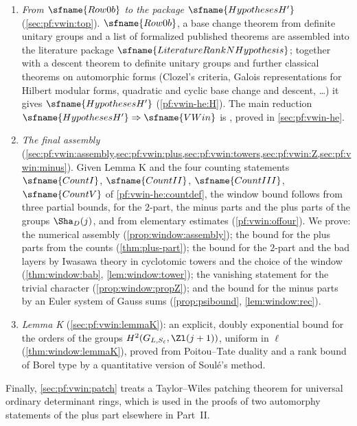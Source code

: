 \begin{enumerate}[label=(\arabic*)]
\item \emph{From $\sfname{Row0b}$ to the package $\sfname{HypothesesH'}$} (\cref{sec:pf:vwin:top}). $\sfname{Row0b}$,
a base change theorem from definite unitary groups and a list of formalized published theorems are assembled into
the literature package $\sfname{LiteratureRankNHypothesis}$; together with a descent theorem to definite unitary
groups and further classical theorems on automorphic forms (Clozel's criteria, Galois representations for Hilbert
modular forms, quadratic and cyclic base change and descent, \dots) it gives $\sfname{HypothesesH'}$
(\cref{pf:vwin-he:H}). The main reduction $\sfname{HypothesesH'}\Rightarrow\sfname{VWin}$ is
, proved in
\cref{sec:pf:vwin-he}.
\item \emph{The final assembly} (\cref{sec:pf:vwin:assembly,sec:pf:vwin:plus,sec:pf:vwin:towers,sec:pf:vwin:Z,sec:pf:vwin:minus}). Given Lemma K and the four counting statements $\sfname{CountI}$, $\sfname{CountII}$,
$\sfname{CountIII}$, $\sfname{CountV}$ of \cref{pf:vwin-he:countdef}, the window bound follows from three partial
bounds, for the $2$-part, the minus parts and the plus parts of the groups $\Sha_D(j)$, and from elementary
estimates (\cref{pf:vwin:offour}). We prove: the numerical assembly (\cref{prop:window:assembly}); the bound for the
plus parts from the counts (\cref{thm:plus-part}); the bound for the $2$-part and the bad layers by Iwasawa theory in
cyclotomic towers and the choice of the window (\cref{thm:window:bab}, \cref{lem:window:tower}); the vanishing
statement for the trivial character (\cref{prop:window:propZ}); and the bound for the minus parts by an Euler system
of Gauss sums (\cref{prop:psibound}, \cref{lem:window:rec}).
\item \emph{Lemma K} (\cref{sec:pf:vwin:lemmaK}): an explicit, doubly exponential bound for the orders of the groups
$H^2(G_{L,S_\ell},\Zl(j+1))$, uniform in $\ell$ (\cref{thm:window:lemmaK}), proved from Poitou--Tate duality and a
rank bound of Borel type by a quantitative version of Soul\'e's method.
\end{enumerate}
Finally, \cref{sec:pf:vwin:patch} treats a Taylor--Wiles patching theorem for universal ordinary determinant rings,
which is used in the proofs of two automorphy statements of the plus part elsewhere in Part~II.

